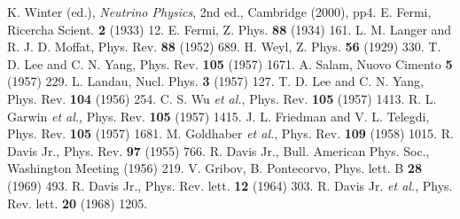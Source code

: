 \begin{thebibliography}{99}
K. Winter (ed.), \emph{Neutrino Physics}, 2nd ed.,
  Cambridge (2000), pp4.
E. Fermi, Ricercha Scient. \textbf{2} (1933) 12.
E. Fermi, Z. Phys. \textbf{88} (1934) 161.
L. M. Langer and R. J. D. Moffat, Phys. Rev.
  \textbf{88} (1952) 689.
H. Weyl, Z. Phys. \textbf{56} (1929) 330.
T. D. Lee and C. N. Yang, Phys. Rev. \textbf{105}
  (1957) 1671.
A. Salam, Nuovo Cimento \textbf{5} (1957) 229.
L. Landau, Nucl. Phys. \textbf{3} (1957) 127.
T. D. Lee and C. N. Yang, Phys. Rev. \textbf{104}
  (1956) 254.
C. S. Wu \textit{et al.}, Phys. Rev. \textbf{105} (1957)
  1413.
R. L. Garwin \textit{et al.}, Phys. Rev. \textbf{105}
  (1957) 1415.
J. L. Friedman and V. L. Telegdi, Phys. Rev.
  \textbf{105} (1957) 1681.
M. Goldhaber \textit{et al.}, Phys. Rev. \textbf{109}
  (1958) 1015.
R. Davis Jr., Phys. Rev. \textbf{97} (1955) 766.
R. Davis Jr., Bull. American Phys. Soc., Washington
  Meeting (1956) 219.
V. Gribov, B. Pontecorvo, Phys. lett. B \textbf{28}
  (1969) 493.
R. Davis Jr., Phys. Rev. lett. \textbf{12} (1964) 303.
R. Davis Jr. \textit{et al.}, Phys. Rev. lett.
  \textbf{20} (1968) 1205.

\end{thebibliography}


